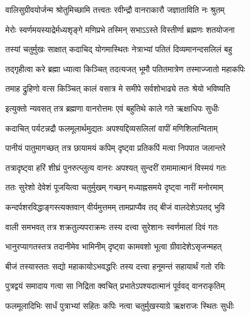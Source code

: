



\twolineshloka
{वालिसुग्रीवयोर्जन्म श्रोतुमिच्छामि तत्त्वतः}
{रवीन्द्रौ वानराकारौ जज्ञाताविति नः श्रुतम्} %


\twolineshloka
{मेरोः स्वर्णमयस्याद्रेर्मध्यशृङ्गे मणिप्रभे}
{तस्मिन् सभाऽऽस्ते विस्तीर्णा ब्रह्मणः शतयोजना} %

\twolineshloka
{तस्यां चतुर्मुखः साक्षात् कदाचिद् योगमास्थितः}
{नेत्राभ्यां पतितं दिव्यमानन्दसलिलं बहु} %

\twolineshloka
{तद्गृहीत्वा करे ब्रह्मा ध्यात्वा किञ्चित् तदत्यजत्}
{भूमौ पतितमात्रेण तस्माज्जातो महाकपिः} %

\twolineshloka
{तमाह द्रुहिणो वत्स किञ्चित् कालं वसात्र मे}
{समीपे सर्वशोभाढ्ये ततः श्रेयो भविष्यति} %

\twolineshloka
{इत्युक्तो न्यवसत् तत्र ब्रह्मणा वानरोत्तमः}
{एवं बहुतिथे काले गते ऋक्षाधिपः सुधीः} %

\twolineshloka
{कदाचित् पर्यटन्नद्रौ फलमूलार्थमुद्यतः}
{अपश्यद्दिव्यसलिलां वापीं मणिशिलान्विताम्} %

\twolineshloka
{पानीयं पातुमागच्छत् तत्र छायामयं कपिम्}
{दृष्ट्वा प्रतिकपिं मत्वा निपपात जलान्तरे} %

\twolineshloka
{तत्रादृष्ट्वा हरिं शीघ्रं पुनरुत्प्लुत्य वानरः}
{अपश्यत् सुन्दरीं रामामात्मानं विस्मयं गतः} %

\twolineshloka
{ततः सुरेशो देवेशं पूजयित्वा चतुर्मुखम्}
{गच्छन् मध्याह्नसमये दृष्ट्वा नारीं मनोरमाम्} %

\twolineshloka
{कन्दर्पशरविद्धाङ्गस्त्यक्तवान् वीर्यमुत्तमम्}
{तामप्राप्यैव तद् बीजं वालदेशेऽपतद् भुवि} %

\twolineshloka
{वाली समभवत् तत्र शक्रतुल्यपराक्रमः}
{तस्य दत्त्वा सुरेशानः स्वर्णमालां दिवं गतः} %

\twolineshloka
{भानुरप्यागतस्तत्र तदानीमेव भामिनीम्}
{दृष्ट्वा कामवशो भूत्वा ग्रीवादेशेऽसृजन्महत्} %

\twolineshloka
{बीजं तस्यास्ततः सद्यो महाकायोऽभवद्धरिः}
{तस्य दत्त्वा हनूमन्तं सहायार्थं गतो रविः} %

\twolineshloka
{पुत्रद्वयं समादाय गत्वा सा निद्रिता क्वचित्}
{प्रभातेऽपश्यदात्मानं पूर्ववद् वानराकृतिम्} %

\twolineshloka
{फलमूलादिभिः सार्धं पुत्राभ्यां सहितः कपिः}
{नत्वा चतुर्मुखस्याग्रे ऋक्षराजः स्थितः सुधीः} %


